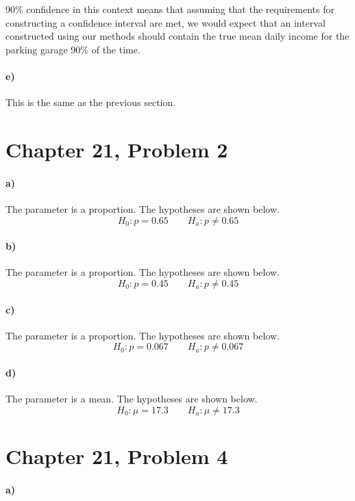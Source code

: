 \documentclass[12pt]{article}
\begin{document}
90\% confidence in this context means that assuming that the requirements for constructing a confidence interval are met,
we would expect that an interval constructed using our methods should contain the true mean daily income for the parking
garage 90\% of the time.

\paragraph{e)}

This is the same as the previous section.

\section*{Chapter 21, Problem 2}

\paragraph{a)}

The parameter is a proportion. The hypotheses are shown below.
\[H_0:p=0.65\qquad H_a:p\neq0.65\]

\paragraph{b)}

The parameter is a proportion. The hypotheses are shown below.
\[H_0:p=0.45\qquad H_a:p\neq0.45\]

\paragraph{c)}

The parameter is a proportion. The hypotheses are shown below.
\[H_0:p=0.067\qquad H_a:p\neq0.067\]

\paragraph{d)}

The parameter is a mean. The hypotheses are shown below.
\[H_0:\mu=17.3\qquad H_a:\mu\neq17.3\]

\section*{Chapter 21, Problem 4}

\paragraph{a)}
\end{document}
